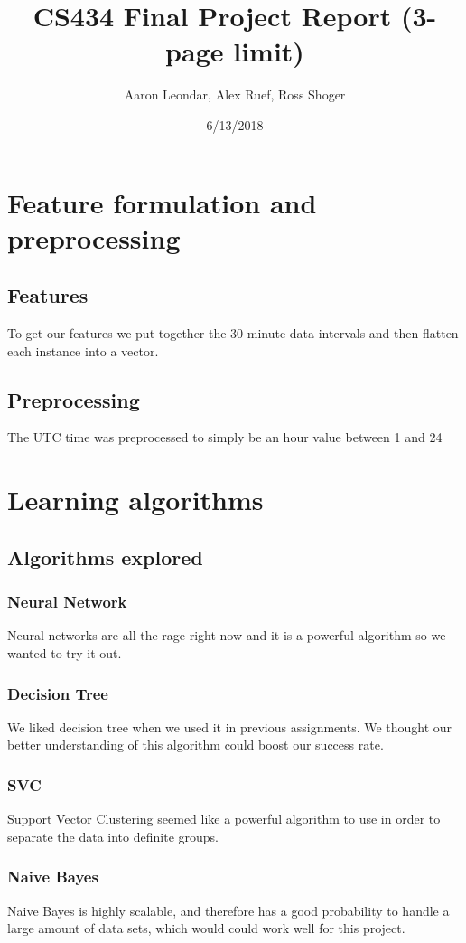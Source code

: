 \documentclass[11pt,a4paper]{article}
\title{CS434 Final Project Report (3-page limit)}
\author{Aaron Leondar, Alex Ruef, Ross Shoger}
\date{6/13/2018}
\begin{document}
\maketitle
\section{Feature formulation and preprocessing}
	\subsection{Features}
	To get our features we put together the 30 minute data intervals and then flatten each instance into a vector.

	\subsection{Preprocessing}
		The UTC time was preprocessed to simply be an hour value between 1 and 24

\section{Learning algorithms}
	\subsection{Algorithms explored}
		\subsubsection{Neural Network}
			Neural networks are all the rage right now and it is a powerful algorithm so we wanted to try it out.

		\subsubsection{Decision Tree}
			We liked decision tree when we used it in previous assignments.
			We thought our better understanding of this algorithm could boost our success rate.

		\subsubsection{SVC}
			Support Vector Clustering seemed like a powerful algorithm to use in order to separate the data into definite groups.

		\subsubsection{Naive Bayes}
			Naive Bayes is highly scalable, and therefore has a good probability to handle a large amount of data sets, which would could work well for this project.
\end{document}
